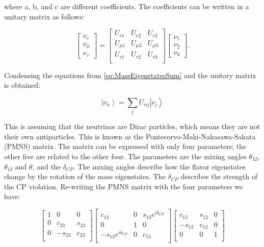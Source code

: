 where a, b, and c are different coefficients. The coefficients can be written in a unitary matrix as follows:

\begin{equation}
    \begin{bmatrix}
        \nu_e \\ \nu_\mu \\ \nu_\tau
    \end{bmatrix}
    = 
    \begin{bmatrix}
        U_{e1} & U_{e2} & U_{e2}\\
        U_{\mu1} & U_{\mu2} & U_{\mu3}\\
        U_{\tau1} & U_{\tau2} & U_{\tau3}\\
    \end{bmatrix}
    \begin{bmatrix}
        \nu_1 \\ \nu_2 \\ \nu_3
    \end{bmatrix}.
\end{equation}

Condensing the equations from \ref{eq:MassEigenstatesSum} and the unitary matrix is obtained:

\begin{equation}
    \left|\nu_\alpha\right> = \sum_j U_{\alpha j}\left|\nu_j \right>
    \label{eq:CondensedPMNS}
\end{equation}

This is assuming that the neutrinos are Dirac particles, which means they are not their own antiparticles. This is known as the Pontecorvo-Maki-Nakasawa-Sakata (PMNS) matrix. The matrix can be expressed with only four parameters; the other five are related to the other four. The parameters are the mixing angles $\theta_{12}$, $\theta_{13}$ and $\theta$, and the $\delta_{CP}$. The mixing angles describe how the flavor eigenstates change by the rotation of the mass eigenstates. The $\delta_{CP}$ describes the strength of the CP violation. Re-writing the PMNS matrix with the four parameters we have:

\begin{equation}
    \begin{bmatrix}
        1 & 0 & 0\\
        0 & c_{23} & s_{23}\\
        0 & -s_{23} & c_{23}\\
    \end{bmatrix}
    \begin{bmatrix}
        c_{13} & 0 & s_{13}e^{i\delta_{CP}}\\
        0 & 1 & 0\\
        -s_{13}e^{i\delta_{CP}} & 0 & c_{13}\\
    \end{bmatrix}
    \begin{bmatrix}
        c_{12} & s_{12} & 0\\
        -s_{12} & c_{12} & 0\\
        0 & 0 & 1\\
    \end{bmatrix}
\end{equation}



